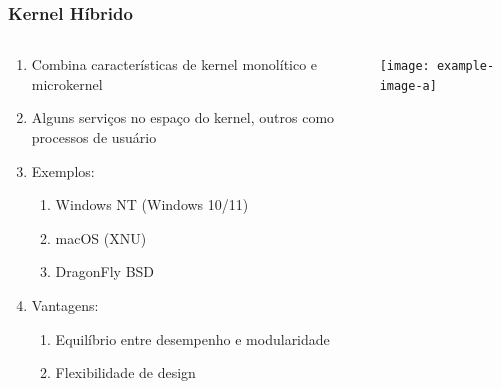 \documentclass{beamer}
\begin{document}
\begin{frame}[fragile]
\frametitle{Kernel Híbrido}

\begin{columns}
    \begin{column}{0.55\textwidth}
        \begin{enumerate}\small
            \item Combina características de kernel monolítico e microkernel
            \item Alguns serviços no espaço do kernel, outros como processos de usuário
            \item Exemplos:
            \begin{enumerate}\footnotesize
                \item Windows NT (Windows 10/11)
                \item macOS (XNU)
                \item DragonFly BSD
            \end{enumerate}
            \item Vantagens:
            \begin{enumerate}\footnotesize
                \item Equilíbrio entre desempenho e modularidade
                \item Flexibilidade de design
            \end{enumerate}
        \end{enumerate}
    \end{column}
    
    \begin{column}{0.45\textwidth}
        \begin{center}
            \texttt{[image: example-image-a]}
        \end{center}
    \end{column}
\end{columns}
\end{frame}
\end{document}
